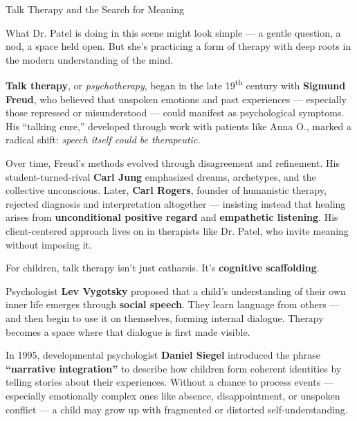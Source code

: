 \medskip

\begin{PsychologicalSidebar}{Talk Therapy and the Search for Meaning}

    What Dr. Patel is doing in this scene might look simple — a gentle question, a nod, a space held open.  
    But she’s practicing a form of therapy with deep roots in the modern understanding of the mind.
    
    \medskip
    
    \textbf{Talk therapy}, or \textit{psychotherapy}, began in the late 19\textsuperscript{th} century 
    with \textbf{Sigmund Freud}, who believed that unspoken emotions and past experiences — especially 
    those repressed or misunderstood — could manifest as psychological symptoms. His ``talking cure,'' 
    developed through work with patients like Anna O., marked a radical shift:  
    \textit{speech itself could be therapeutic.}
    
    \medskip
    
    Over time, Freud’s methods evolved through disagreement and refinement. His student-turned-rival 
    \textbf{Carl Jung} emphasized dreams, archetypes, and the collective unconscious. Later, \textbf{Carl 
    Rogers}, founder of humanistic therapy, rejected diagnosis and interpretation altogether — insisting 
    instead that healing arises from \textbf{unconditional positive regard} and \textbf{empathetic 
    listening}. His client-centered approach lives on in therapists like Dr. Patel, who invite meaning 
    without imposing it.
    
    \medskip
    
    For children, talk therapy isn’t just catharsis. It’s \textbf{cognitive scaffolding}.
    
    Psychologist \textbf{Lev Vygotsky} proposed that a child’s understanding of their own inner life 
    emerges through \textbf{social speech}. They learn language from others — and then begin to use it 
    on themselves, forming internal dialogue. Therapy becomes a space where that dialogue is first 
    made visible.
    
    \medskip
    
    In 1995, developmental psychologist \textbf{Daniel Siegel} introduced the phrase \textbf{“narrative 
    integration”} to describe how children form coherent identities by telling stories about their 
    experiences. Without a chance to process events — especially emotionally complex ones like absence, 
    disappointment, or unspoken conflict — a child may grow up with fragmented or distorted 
    self-understanding.
    

\end{PsychologicalSidebar}
